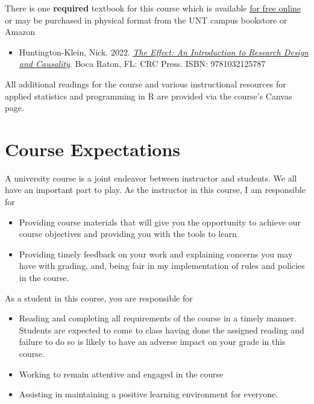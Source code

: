 \documentclass[12pt,]{article}
\providecommand{\tightlist}{%
  \setlength{\itemsep}{0pt}\setlength{\parskip}{0pt}}
\begin{document}
\noindent There is one \textbf{required} textbook for this course which
is available \href{https://theeffectbook.net/}{for free online} or may
be purchased in physical format from the UNT campus bookstore or Amazon

\begin{itemize}
\tightlist
\item
  Huntington-Klein, Nick. 2022.
  \href{https://theeffectbook.net/}{\emph{The Effect: An Introduction to
  Research Design and Causality}}. Boca Raton, FL: CRC Press. ISBN:
  9781032125787
\end{itemize}

All additional readings for the course and various instructional
resources for applied statistics and programming in R are provided via
the course's Canvas page.

\hypertarget{course-expectations}{%
\section{Course Expectations}\label{course-expectations}}

\noindent A university course is a joint endeavor between instructor and
students. We all have an important part to play. As the instructor in
this course, I am responsible for

\begin{itemize}
\item
  Providing course materials that will give you the opportunity to
  achieve our course objectives and providing you with the tools to
  learn
\item
  Providing timely feedback on your work and explaining concerns you may
  have with grading, and, being fair in my implementation of rules and
  policies in the course.
\end{itemize}

As a student in this course, you are responsible for

\begin{itemize}
\item
  Reading and completing all requirements of the course in a timely
  manner. Students are expected to come to class having done the
  assigned reading and failure to do so is likely to have an adverse
  impact on your grade in this course.
\item
  Working to remain attentive and engaged in the course
\item
  Assisting in maintaining a positive learning environment for everyone.
\end{itemize}
\end{document}
